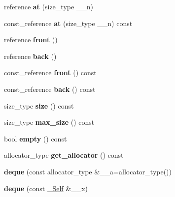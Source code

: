 \begin{DoxyCompactItemize}
reference {\bfseries at} (size\+\_\+type \+\_\+\+\_\+n)
\item 
\mbox{\label{classdeque_aa61b2cf963a40af573a91a00d8231e00}} 
const\+\_\+reference {\bfseries at} (size\+\_\+type \+\_\+\+\_\+n) const
\item 
\mbox{\label{classdeque_ae6d38eb626b619b2fb356f170b250d93}} 
reference {\bfseries front} ()
\item 
\mbox{\label{classdeque_a737db581f2ebbe096db0dddf7b8626db}} 
reference {\bfseries back} ()
\item 
\mbox{\label{classdeque_a671d811eddb80d64a420e0449583a7bb}} 
const\+\_\+reference {\bfseries front} () const
\item 
\mbox{\label{classdeque_a0306fdef6e078601dd982b4c22f5fd9f}} 
const\+\_\+reference {\bfseries back} () const
\item 
\mbox{\label{classdeque_a6742ae6f3d0500ddc63857116badf7b1}} 
size\+\_\+type {\bfseries size} () const
\item 
\mbox{\label{classdeque_a1d5b708bad53263dbcfce7569d66906b}} 
size\+\_\+type {\bfseries max\+\_\+size} () const
\item 
\mbox{\label{classdeque_a4629b471ae5aba7a88d2398fb78b87fa}} 
bool {\bfseries empty} () const
\item 
\mbox{\label{classdeque_aac4f51b1ebd3a9a96effbd7302b8c3e9}} 
allocator\+\_\+type {\bfseries get\+\_\+allocator} () const
\item 
\mbox{\label{classdeque_a5bbdb37e77ced88dce8da510457b67dd}} 
{\bfseries deque} (const allocator\+\_\+type \&\+\_\+\+\_\+a=allocator\+\_\+type())
\item 
\mbox{\label{classdeque_ae315582b08dbf9ac98a7f7c44d022a2f}} 
{\bfseries deque} (const \hyperlink{classdeque}{\+\_\+\+Self} \&\+\_\+\+\_\+x)
\item 
\mbox{\label{classdeque_a8fd0ac7e13a8aa7f63a113642bac5c57}} 

\end{DoxyCompactItemize}
